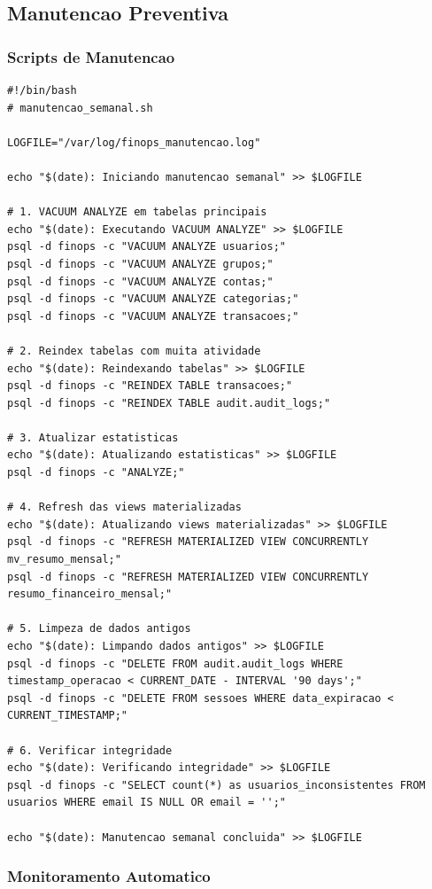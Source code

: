 \subsection{Manutencao Preventiva}

\subsubsection{Scripts de Manutencao}

\begin{lstlisting}[caption=Rotina de manutencao semanal]
#!/bin/bash
# manutencao_semanal.sh

LOGFILE="/var/log/finops_manutencao.log"

echo "$(date): Iniciando manutencao semanal" >> $LOGFILE

# 1. VACUUM ANALYZE em tabelas principais
echo "$(date): Executando VACUUM ANALYZE" >> $LOGFILE
psql -d finops -c "VACUUM ANALYZE usuarios;"
psql -d finops -c "VACUUM ANALYZE grupos;"
psql -d finops -c "VACUUM ANALYZE contas;"
psql -d finops -c "VACUUM ANALYZE categorias;"
psql -d finops -c "VACUUM ANALYZE transacoes;"

# 2. Reindex tabelas com muita atividade
echo "$(date): Reindexando tabelas" >> $LOGFILE
psql -d finops -c "REINDEX TABLE transacoes;"
psql -d finops -c "REINDEX TABLE audit.audit_logs;"

# 3. Atualizar estatisticas
echo "$(date): Atualizando estatisticas" >> $LOGFILE
psql -d finops -c "ANALYZE;"

# 4. Refresh das views materializadas
echo "$(date): Atualizando views materializadas" >> $LOGFILE
psql -d finops -c "REFRESH MATERIALIZED VIEW CONCURRENTLY mv_resumo_mensal;"
psql -d finops -c "REFRESH MATERIALIZED VIEW CONCURRENTLY resumo_financeiro_mensal;"

# 5. Limpeza de dados antigos
echo "$(date): Limpando dados antigos" >> $LOGFILE
psql -d finops -c "DELETE FROM audit.audit_logs WHERE timestamp_operacao < CURRENT_DATE - INTERVAL '90 days';"
psql -d finops -c "DELETE FROM sessoes WHERE data_expiracao < CURRENT_TIMESTAMP;"

# 6. Verificar integridade
echo "$(date): Verificando integridade" >> $LOGFILE
psql -d finops -c "SELECT count(*) as usuarios_inconsistentes FROM usuarios WHERE email IS NULL OR email = '';"

echo "$(date): Manutencao semanal concluida" >> $LOGFILE
\end{lstlisting}

\subsubsection{Monitoramento Automatico}

